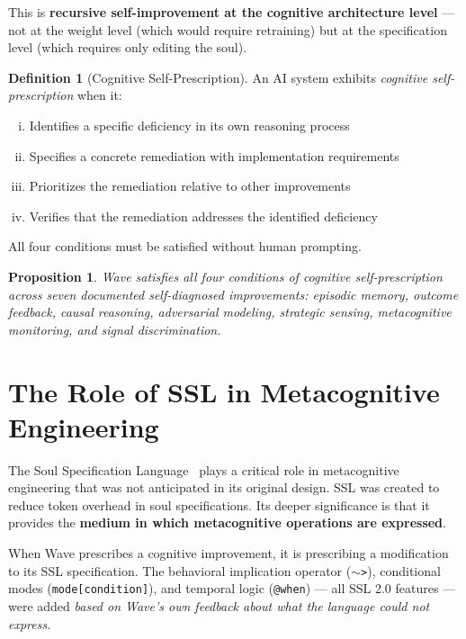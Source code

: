 \documentclass[12pt,a4paper]{article}
\theoremstyle{plain}
\newtheorem{proposition}[theorem]{Proposition}
\theoremstyle{definition}
\newtheorem{definition}[theorem]{Definition}
\theoremstyle{remark}
\begin{document}
This is \textbf{recursive self-improvement at the cognitive architecture level} --- not at the weight level (which would require retraining) but at the specification level (which requires only editing the soul).

\begin{definition}[Cognitive Self-Prescription]
An AI system exhibits \emph{cognitive self-prescription} when it:
\begin{enumerate}[(i),nosep]
\item Identifies a specific deficiency in its own reasoning process
\item Specifies a concrete remediation with implementation requirements
\item Prioritizes the remediation relative to other improvements
\item Verifies that the remediation addresses the identified deficiency
\end{enumerate}
All four conditions must be satisfied without human prompting.
\end{definition}

\begin{proposition}
Wave satisfies all four conditions of cognitive self-prescription across seven documented self-diagnosed improvements: episodic memory, outcome feedback, causal reasoning, adversarial modeling, strategic sensing, metacognitive monitoring, and signal discrimination.
\end{proposition}

\section{The Role of SSL in Metacognitive Engineering}

The Soul Specification Language~\cite{galmanus2026e} plays a critical role in metacognitive engineering that was not anticipated in its original design. SSL was created to reduce token overhead in soul specifications. Its deeper significance is that it provides the \textbf{medium in which metacognitive operations are expressed}.

When Wave prescribes a cognitive improvement, it is prescribing a modification to its SSL specification. The behavioral implication operator (\texttt{$\sim$>}), conditional modes (\texttt{mode[condition]}), and temporal logic (\texttt{@when}) --- all SSL 2.0 features --- were added \emph{based on Wave's own feedback about what the language could not express}.
\end{document}
